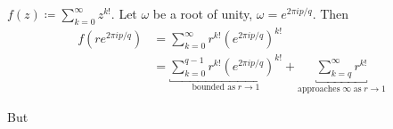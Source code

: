 \documentclass{article}
\begin{document}
\begin{eg}
    $f(z) \coloneqq \sum_{k=0}^\infty z^{k!}$. Let $\omega$ be a root of unity, $\omega = e^{2 \pi i p/q}$.
    Then
    \begin{align*}
        f(r e^{2\pi i p/q}) &= \sum_{k=0}^\infty r^{k!} (e^{2 \pi i p/q})^{k!} \\
                            &= \underbracket{\sum_{k=0}^{q-1} r^{k!} (e^{2 \pi i p/q})^{k!}}_{\text{bounded as} \; r \to 1} + \underbracket{\sum_{k=q}^\infty r^{k!}}_{\text{approaches} \; \infty \; \text{as} \; r \to 1}
    \end{align*}

    But
\end{eg}
\end{document}

